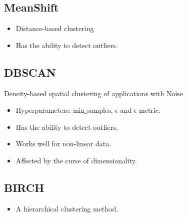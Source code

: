 \documentclass[a4paper, 12pt]{report}
\begin{document}
\subsection{MeanShift}
\begin{itemize}
\item Distance-based clustering
\item Has the ability to detect outliers.
\end{itemize}

\subsection{DBSCAN}
Density-based spatial clustering of applications with Noise
\begin{itemize}
\item Hyperparameters: min$\_$samples, $\epsilon$ and $\epsilon$-metric.
\item Has the ability to detect outliers.
\item Works well for non-linear data.
\item Affected by the curse of dimensionality.
\end{itemize}

\subsection{BIRCH}
\begin{itemize}
\item A hierarchical clustering method.
\end{itemize}
\end{document}

